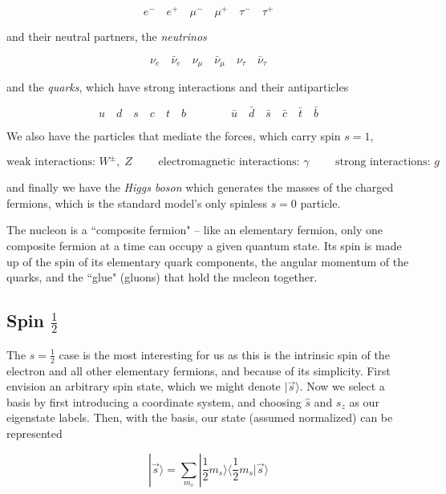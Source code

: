 \[
  e^- \quad e^+ \quad \mu^- \quad \mu^+ \quad \tau^- \quad \tau^+ 
\] \vspace{3px}

and their neutral partners, the \textit{neutrinos}

\[
  \nu_e \quad \bar{\nu}_e \quad \nu_\mu \quad \bar{\nu}_\mu \quad \nu_\tau
  \quad \bar{\nu}_\tau 
\] \vspace{3px}

and the \textit{quarks}, which have strong interactions and their antiparticles 

\[
  u \quad d \quad s \quad c \quad t \quad b \qquad \qquad \bar{u} \quad
  \bar{d} \quad \bar{s} \quad \bar{c} \quad \bar{t} \quad \bar{b} 
\] \vspace{3px}

We also have the particles that mediate the forces, which carry spin $s = 1$, 

\[
\text{weak interactions: } W^\pm, \; Z \qquad \text{ electromagnetic
interactions: } \gamma \qquad \text{ strong interactions: } g 
\] \vspace{3px}

and finally we have the \textit{Higgs boson} which generates the masses of the charged
fermions, which is the standard model's only spinless $s = 0$ particle. 

The nucleon is a ``composite fermion" -- like an elementary fermion, only one
composite fermion at a time can occupy a given quantum state. Its spin is made
up of the spin of its elementary quark components, the angular momentum of the
quarks, and the ``glue" (gluons) that hold the nucleon together. 


\subsection{Spin $\frac{1}{2}$}

The $s = \frac{1}{2}$ case is the most interesting for us as this is the
intrinsic spin of the electron and all other elementary fermions, and because
of its simplicity. First envision an arbitrary spin state, which we might
denote $|\vec{s}\rangle$. Now we select a basis by first introducing
a coordinate system, and choosing $\hat{s}$ and $s_z$ as our eigenstate labels.
Then, with the basis, our state (assumed normalized) can be represented 

\[
|\vec{s}\rangle = \sum_{m_s}^{} | \frac{1}{2} m_s \rangle \langle \frac{1}{2}
m_s | \vec{s}\rangle
\] \vspace{3px}


